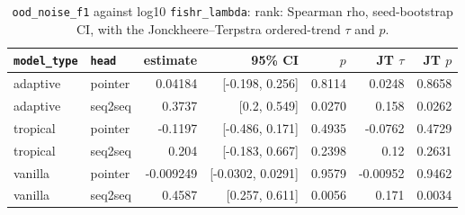 \documentclass[10pt]{article}
\begin{document}
{\small
\begin{longtable}{llrrrrr}
\caption{\texttt{ood\_noise\_f1} against log10 \texttt{fishr\_lambda}: rank: Spearman rho, seed-bootstrap CI, with the Jonckheere--Terpstra ordered-trend $\tau$ and $p$.}\label{tab:trend-ood_noise_f1}\\
\toprule
\texttt{model\_type} & \texttt{head} & estimate & 95\% CI & $p$ & JT $\tau$ & JT $p$\\
\midrule
\endhead
adaptive & pointer & 0.04184 & [-0.198, 0.256] & 0.8114 & 0.0248 & 0.8658\\
adaptive & seq2seq & 0.3737 & [0.2, 0.549] & 0.0270 & 0.158 & 0.0262\\
tropical & pointer & -0.1197 & [-0.486, 0.171] & 0.4935 & -0.0762 & 0.4729\\
tropical & seq2seq & 0.204 & [-0.183, 0.667] & 0.2398 & 0.12 & 0.2631\\
vanilla & pointer & -0.009249 & [-0.0302, 0.0291] & 0.9579 & -0.00952 & 0.9462\\
vanilla & seq2seq & 0.4587 & [0.257, 0.611] & 0.0056 & 0.171 & 0.0034\\
\bottomrule
\end{longtable}
}
\end{document}
